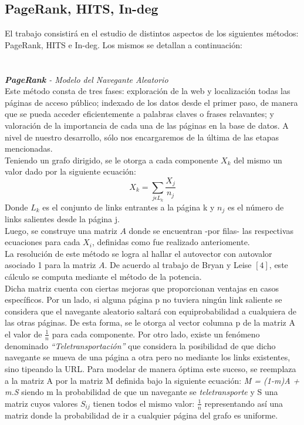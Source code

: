 \documentclass[a4paper]{article}
\begin{document}
\subsection{PageRank, HITS, In-deg}
El trabajo consistir\'a en el estudio de distintos aspectos de los siguientes m\'etodos: PageRank,
HITS e In-deg. Los mismos se detallan a continuaci\'on: \\
\\
\\
\indent \indent \emph{\textbf{PageRank} - Modelo del Navegante Aleatorio} \\
\indent Este m\'etodo consta de tres fases: exploraci\'on de la web y localizaci\'on todas las p\'aginas de acceso p\'ublico; indexado de los datos desde el primer paso, de manera que se pueda acceder eficientemente a palabras claves o frases relavantes; y valoraci\'on de la importancia de cada una de las p\'aginas en la base de datos. A nivel de nuestro desarrollo, s\'olo nos encargaremos de la \'ultima de las etapas mencionadas.\\
\indent Teniendo un grafo dirigido, se le otorga a cada componente $X_k$ del mismo un valor dado por la siguiente ecuaci\'on:
\[
 X_k = \sum_{j \epsilon L_k} \frac{X_j}{n_j}
\]
Donde\emph{ $L_k$} es el conjunto de links entrantes a la p\'agina k y \emph{$n_j$} es el n\'umero de links salientes desde la p\'agina j.\\
\indent Luego, se construye una matriz $A$ donde se encuentran -por filas- las respectivas ecuaciones para cada $X_i$, definidas como fue realizado anteriomente.\\
\indent La resoluci\'on de este m\'etodo se logra al hallar el autovector con autovalor asociado 1 para la matriz $A$. De acuerdo al trabajo de Bryan y Leise $[4]$, este c\'alculo se computa mediante el m\'etodo de la potencia. \\
\indent Dicha matriz cuenta con ciertas mejoras que proporcionan ventajas en casos espec\'ificos. Por un lado, si alguna p\'agina p no tuviera ning\'un link saliente se considera que el navegante aleatorio saltar\'a con equiprobabilidad a cualquiera de las otras p\'aginas. De esta forma, se le otorga al vector columna p de la matriz A el valor de $\frac{1}{n}$ para cada componente. Por otro lado, existe un fen\'omeno denominado \textit{``Teletransportaci\'on''} que considera la posibilidad de que dicho navegante se mueva de una p\'agina a otra pero no mediante los links existentes, sino tipeando la URL. Para modelar de manera \'optima este suceso, se reemplaza a la matriz A por la matriz M definida bajo la siguiente ecuaci\'on: \textit{M = (1-m)A + m.S} siendo m la probabilidad de que un navegante se \textit{teletransporte} y S una matriz cuyos valores $S_{ij}$ tienen todos el mismo valor: $\frac{1}{n}$ representando as\'i una matriz donde la probabilidad de ir a cualquier p\'agina del grafo es uniforme.\\
\end{document}

